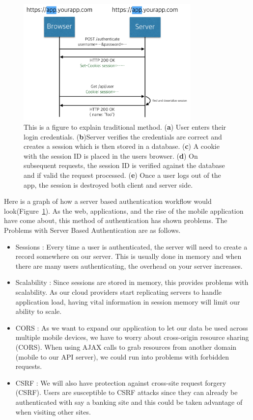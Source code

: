 \documentclass[journal,article,submit,moreauthors,pdftex,10pt,a4paper]{mdpi}
\begin{document}
\begin{figure}[H]
\centering
\includegraphics[width=9cm]{figures/traditional}
\caption{This is a figure to explain traditional method. (\textbf{a}) User enters their login credentials. (\textbf{b})Server verifies the credentials are correct and creates a session which is then stored in a database. (\textbf{c}) A cookie with the session ID is placed in the users browser. (\textbf{d}) On subsequent requests, the session ID is verified against the database and if valid the request processed. (\textbf{e}) Once a user logs out of the app, the session is destroyed both client and server side.}
\label{traditional}
\end{figure}

Here is a graph of how a server based authentication workflow would look(Figure~\ref{traditional}). As the web, applications, and the rise of the mobile application have come about, this method of authentication has shown problems\cite{authentication-mobile, attacks}.
The Problems with Server Based Authentication are as follows.
\begin{itemize}[leftmargin=*,labelsep=4mm]
\item	Sessions : Every time a user is authenticated, the server will need to create a record somewhere on our server. This is usually done in memory and when there are many users authenticating, the overhead on your server increases.
\item	Scalability : Since sessions are stored in memory, this provides problems with scalability. As our cloud providers start replicating servers to handle application load, having vital information in session memory will limit our ability to scale.
\item	CORS : As we want to expand our application to let our data be used across multiple mobile devices, we have to worry about cross-origin resource sharing (CORS). When using AJAX calls to grab resources from another domain (mobile to our API server), we could run into problems with forbidden requests.
\item	CSRF : We will also have protection against cross-site request forgery (CSRF). Users are susceptible to CSRF attacks since they can already be authenticated with say a banking site and this could be taken advantage of when visiting other sites.
\end{itemize}
\end{document}
